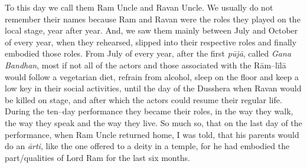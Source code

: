 To this day we call them Ram Uncle and Ravan Uncle. We usually do not remember their names because Ram and Ravan were the roles they played on the local stage, year after year. And, we saw them mainly between July and October of every year, when they rehearsed, slipped into their respective roles and finally embodied those roles. From July of every year, after the first \textit{pūjā}, called \textit{Gana Bandhan}, most if not all of the actors and those associated with the Rām–līlā would follow a vegetarian diet, refrain from alcohol, sleep on the floor and keep a low key in their social activities, until the day of the Dusshera when Ravan would be killed on stage, and after which the actors could resume their regular life. During the ten–day performance they became their roles, in the way they walk, the way they speak and the way they live. So much so, that on the last day of the performance, when Ram Uncle returned home, I was told, that his parents would do an \textit{ārti}, like the one offered to a deity in a temple, for he had embodied the part/qualities of Lord Ram for the last six months.

